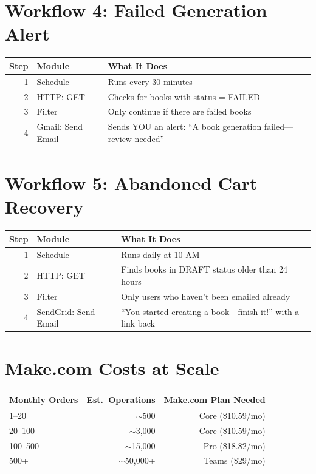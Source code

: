 \documentclass[12pt, letterpaper, oneside]{book}
\begin{document}
\section{Workflow 4: Failed Generation Alert}

\begin{table}[H]
\centering
\small
\begin{tabularx}{\textwidth}{rlX}
\toprule
\textbf{Step} & \textbf{Module} & \textbf{What It Does} \\
\midrule
1 & Schedule & Runs every 30 minutes \\
2 & HTTP: GET & Checks for books with status = FAILED \\
3 & Filter & Only continue if there are failed books \\
4 & Gmail: Send Email & Sends YOU an alert: ``A book generation failed---review needed'' \\
\bottomrule
\end{tabularx}
\end{table}

\section{Workflow 5: Abandoned Cart Recovery}

\begin{table}[H]
\centering
\small
\begin{tabularx}{\textwidth}{rlX}
\toprule
\textbf{Step} & \textbf{Module} & \textbf{What It Does} \\
\midrule
1 & Schedule & Runs daily at 10 AM \\
2 & HTTP: GET & Finds books in DRAFT status older than 24 hours \\
3 & Filter & Only users who haven't been emailed already \\
4 & SendGrid: Send Email & ``You started creating a book---finish it!'' with a link back \\
\bottomrule
\end{tabularx}
\end{table}

\section{Make.com Costs at Scale}

\begin{table}[H]
\centering
\begin{tabular}{lrr}
\toprule
\textbf{Monthly Orders} & \textbf{Est.\ Operations} & \textbf{Make.com Plan Needed} \\
\midrule
1--20 & $\sim$500 & Core (\$10.59/mo) \\
20--100 & $\sim$3{,}000 & Core (\$10.59/mo) \\
100--500 & $\sim$15{,}000 & Pro (\$18.82/mo) \\
500+ & $\sim$50{,}000+ & Teams (\$29/mo) \\
\bottomrule
\end{tabular}
\end{table}
\end{document}
